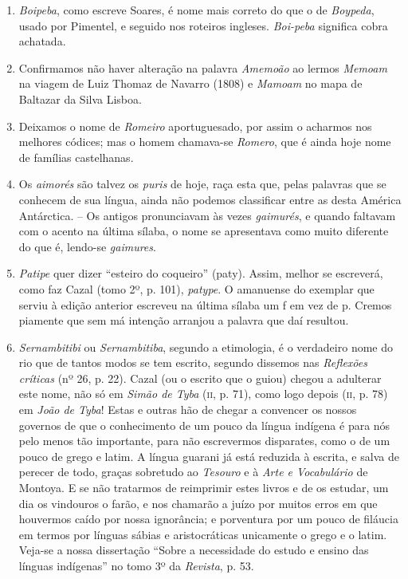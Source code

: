 \begin{enumerate}
\item \textit{Boipeba}, como escreve Soares, é nome mais correto do que o de \textit{Boypeda}, usado por 
Pimentel, e seguido nos roteiros ingleses. \textit{Boi-peba} significa cobra achatada.

\item Confirmamos não haver alteração na palavra \textit{Amemoão} ao lermos \textit{Memoam} na 
viagem de Luiz Thomaz de Navarro (1808) e \textit{Mamoam} no mapa de  Baltazar da 
Silva Lisboa.

\item Deixamos o nome de \textit{Romeiro} aportuguesado, por assim o acharmos nos melhores 
códices; mas o homem chamava-se \textit{Romero}, que é ainda hoje nome de famílias 
castelhanas.

\item Os \textit{aimorés} são talvez os \textit{puris} de hoje, raça esta que, pelas palavras que se 
conhecem de sua língua, ainda não podemos classificar entre as desta América 
Antárctica. -- Os antigos pronunciavam às vezes \textit{gaimurés}, e quando faltavam com o 
acento na última sílaba, o nome se apresentava como muito diferente do que é, 
lendo-se \textit{gaimures}.

\item \textit{Patipe} quer dizer ``esteiro do coqueiro'' (paty). Assim, melhor se escreverá, como 
faz Cazal (tomo 2º, p. 101), \textit{patype}. O amanuense do exemplar que serviu à edição 
anterior escreveu na última sílaba um f em vez de p. Cremos piamente que sem má intenção arranjou a palavra que daí resultou.

\item  \textit{Sernambitibi} ou \textit{Sernambitiba}, segundo a etimologia, é o verdadeiro nome do rio 
que de tantos modos se tem escrito, segundo dissemos nas \textit{Reflexões críticas} (nº 26, p. 
22). Cazal (ou o escrito que o guiou) chegou a adulterar este nome, não só em 
\textit{Simão de Tyba} (\textsc{ii}, p. 71), como logo depois (\textsc{ii}, p. 78) em \textit{João de Tyba}! Estas e outras hão de 
chegar a convencer os nossos governos de que o conhecimento de um pouco da língua 
indígena é para nós pelo menos tão importante, para não escrevermos disparates, como 
o de um pouco de grego e latim. A língua guarani já está reduzida à escrita, e salva de 
perecer de todo, graças sobretudo ao \textit{Tesouro} e à \textit{Arte e Vocabulário} de Montoya. E se 
não tratarmos de reimprimir estes livros e de os estudar, um dia os vindouros o farão, e 
nos chamarão a juízo por muitos erros em que houvermos caído por nossa ignorância; e 
porventura por um pouco de filáucia em termos por línguas sábias e aristocráticas 
unicamente o grego e o latim. Veja-se a nossa dissertação ``Sobre a necessidade do 
estudo e ensino das línguas indígenas'' no tomo 3º da \textit{Revista}, p. 53.


\end{enumerate}
